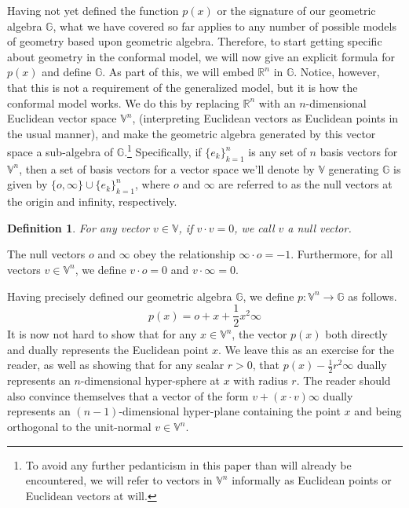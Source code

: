 \documentclass[12pt]{article}
\newcommand{\G}{\mathbb{G}}
\newcommand{\V}{\mathbb{V}}
\newcommand{\R}{\mathbb{R}}
\newcommand{\nvao}{o}
\newcommand{\nvai}{\infty}
\newtheorem{definition}{Definition}[section]
\begin{document}
Having not yet defined the function $p(x)$ or the signature of our
geometric algebra $\G$, what we have covered so far applies to
any number of possible models of geometry based upon geometric algebra.
Therefore, to start getting specific about geometry in the conformal model,
we will now give an explicit formula for $p(x)$ and define $\G$.
As part of this, we will embed $\R^n$ in $\G$.  Notice, however, that
this is not a requirement of the generalized model, but it is how
the conformal model works.
We do this by replacing $\R^n$
with an $n$-dimensional Euclidean vector space $\V^n$, (interpreting
Euclidean vectors as Euclidean points in the usual manner), and
make the geometric algebra generated by this vector space
a sub-algebra of $\G$.\footnote{To avoid any further pedanticism in this paper than will already be encountered,
we will refer to vectors in $\V^n$ informally as Euclidean points or Euclidean vectors at will.}
Specifically, if $\{e_k\}_{k=1}^n$ is
any set of $n$ basis vectors for $\V^n$, then a set of
basis vectors for a vector space we'll denote by $\V$ generating $\G$
is given by $\{\nvao,\nvai\}\cup\{e_k\}_{k=1}^n$, where $\nvao$ and $\nvai$ are
referred to as the null vectors
at the origin and infinity, respectively.
\begin{definition}
For any vector $v\in\V$, if $v\cdot v=0$, we call $v$ a null vector.
\end{definition}
The null vectors $\nvao$ and $\nvai$ obey the relationship
$\nvai\cdot\nvao=-1$.  Furthermore, for
all vectors $v\in\V^n$, we define $v\cdot\nvao=0$ and $v\cdot\nvai=0$.

Having precisely defined our geometric algebra $\G$, we define
$p:\V^n\to\G$ as follows.
\begin{equation*}
p(x) = \nvao + x + \frac{1}{2}x^2\nvai
\end{equation*}
It is now not hard to show that for any $x\in\V^n$, the vector $p(x)$
both directly and dually represents the Euclidean point $x$.  We leave
this as an exercise
for the reader, as well as showing that for any scalar $r>0$, that
$p(x)-\frac{1}{2}r^2\nvai$ dually represents an $n$-dimensional hyper-sphere
at $x$ with radius $r$.  The reader should also convince themselves that a
vector of the form $v+(x\cdot v)\nvai$ dually represents an $(n-1)$-dimensional
hyper-plane containing the
point $x$ and being orthogonal to the unit-normal $v\in\V^n$.
\end{document}
